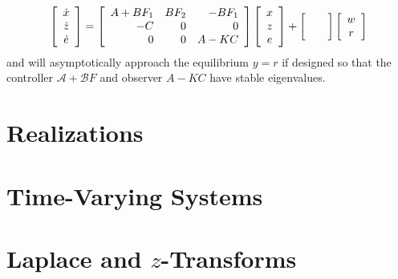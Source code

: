 \documentclass{report}
\begin{document}
$$
\left[\begin{array}{c}
  \dot{x} \\
  \dot{z} \\
  \dot{e}
\end{array}\right] =
\left[\begin{array}{r r r}
  A + B F_1 & B F_2 & -B F_1 \\
  -C        & 0     &  0     \\
   0        & 0     &  A - K C
\end{array}\right]
\left[\begin{array}{c}
  x \\
  z \\
  e
\end{array}\right]
+
\left[\begin{array}{c}
  \quad \\
  \quad
\end{array}\right]
\left[\begin{array}{c}
  w \\
  r
\end{array}\right]
$$
and will asymptotically approach the equilibrium $y = r$ if designed
so that the controller $\mathcal{A} + \mathcal{B} F$ and
observer $A - K C$ have stable eigenvalues.

\section{Realizations}

\section{Time-Varying Systems}

\section{Laplace and $z$-Transforms}
\end{document}
